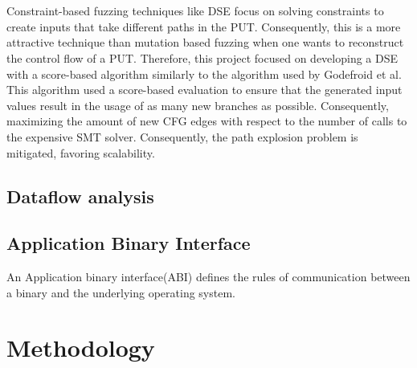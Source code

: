 \documentclass{kththesis}
\begin{document}
\\ \\
Constraint-based fuzzing techniques like DSE focus on solving constraints to create inputs that take different paths in the PUT. Consequently, this is a more attractive technique than mutation based fuzzing when one wants to reconstruct the control flow of a PUT. Therefore, this project focused on developing a DSE with a score-based algorithm similarly to the algorithm used by Godefroid et al\cite{automatedFuzzing}. This algorithm used a score-based evaluation to ensure that the generated input values result in the usage of as many new branches as possible. Consequently, maximizing the amount of new CFG edges with respect to the number of calls to the expensive SMT solver\cite{automatedFuzzing}. Consequently, the path explosion problem is mitigated, favoring scalability.



\section{Dataflow analysis}


\section{Application Binary Interface}
An Application binary interface(ABI) defines the rules of communication between a binary and the underlying operating system.


\chapter{Methodology}\label{chap:methodlogy}
\end{document}
